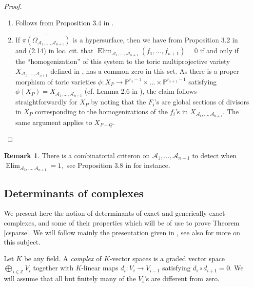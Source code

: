 \documentclass[a4paper,11pt]{amsart}
\newcommand{\Elim}{\operatorname{Elim}}
\renewcommand{\P}{\mathbb{P}}
\newcommand{\Z}{\mathbb{Z}}
\newcommand{\cA}{{\mathcal A}}
\newcounter{thm}
\numberwithin{thm}{section}
\numberwithin{equation}{section}
\theoremstyle{definition}
\newtheorem{remark}[thm]{Remark}
\theoremstyle{plain}
\begin{document}
\begin{proof} $^{}$
\begin{enumerate}
\item Follows from Proposition $3.4$ in \cite{DS15}.
\item If  $\overline{\pi(\Omega_{\cA_1,\ldots,\cA_{n+1}})}$ is a hypersurface, then we have from Proposition 3.2 in \cite{DS15}  and (2.14) in loc. cit. that $\Elim_{\cA_1,\ldots, \cA_{n+1}}(f_1,\ldots, f_{n+1})=0$ if and only if the ``homogenization'' of this system to  the toric multiprojective variety $X_{\cA_1,\ldots, \cA_{n+1}}$ defined in \cite[(2.17)]{DS15}, has a common zero in this set. As there is a proper morphism of toric varieties $\phi:X_P\to\P^{r_1-1}\times\ldots\times\P^{r_{n+1}-1}$ satisfying $\phi(X_P)=X_{\cA_1,\ldots,\cA_{n+1}}$  (cf. Lemma $2.6$ in \cite{DS15}), the claim follows straightforwardly for $X_P$ by noting that the $F_i$'s are global sections of divisors in $X_P$ corresponding to the homogenizations of the $f_i$'s in $X_{\cA_1,\ldots, \cA_{n+1}}$. The same argument applies to $X_{P+Q}.$
\end{enumerate}
\end{proof}

\begin{remark}
There is a combinatorial criteron on $\cA_1,\ldots, \cA_{n+1}$ to detect when $ \Elim_{\cA_1,\ldots, \cA_{n+1}}=1,$ see Proposition $3.8$ in \cite{DS15} for instance.
\end{remark}


\medskip
\subsection{Determinants of complexes}\label{detc}
We present here the notion of determinants of exact and generically exact complexes, and some of their properties which will be of use to prove Theorem \ref{csparse}.
We will follow mainly the presentation given in \cite[Appendix A]{GKZ94}, see also \cite{dem84,cha93} for more on this subject.

Let $K$ be any field. A {\em complex} of  $K$-vector spaces is a graded vector space $\bigoplus_{i\in\Z} V_i$ together with $K$-linear maps $
d_i:V_i\to V_{i-1}$ satisfying $d_i\circ d_{i+1}=0.$
We will assume that all but finitely many of the $V_i$'s are different from zero.
\end{document}
